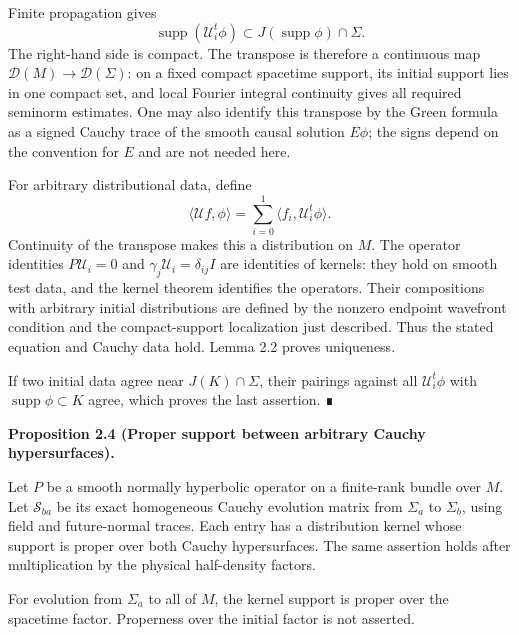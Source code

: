 \documentclass[
  english,
  11pt,
  reqno]{amsart}
\makeatletter
\newcommand{\pandocstatementheading}[1]{%
  \par\addpenalty{\@beginparpenalty}%
  \addvspace{.5\baselineskip plus .2\baselineskip minus .2\baselineskip}%
  {\normalfont\bfseries #1\par}%
  \nobreak\@afterindenttrue\@afterheading
}
\makeatother
\begin{document}
Finite propagation gives \[
\operatorname{supp}(\mathcal U_i^t\phi)
\subset J(\operatorname{supp}\phi)\cap\Sigma.
\] The right-hand side is compact. The transpose is therefore a
continuous map \(\mathcal D(M)\to\mathcal D(\Sigma)\): on a fixed
compact spacetime support, its initial support lies in one compact set,
and local Fourier integral continuity gives all required seminorm
estimates. One may also identify this transpose by the Green formula as
a signed Cauchy trace of the smooth causal solution \(E\phi\); the signs
depend on the convention for \(E\) and are not needed here.

For arbitrary distributional data, define \[
\langle\mathcal U f,\phi\rangle
=\sum_{i=0}^1\langle f_i,\mathcal U_i^t\phi\rangle.
\] Continuity of the transpose makes this a distribution on \(M\). The
operator identities \(P\mathcal U_i=0\) and
\(\gamma_j\mathcal U_i=\delta_{ij}I\) are identities of kernels: they
hold on smooth test data, and the kernel theorem identifies the
operators. Their compositions with arbitrary initial distributions are
defined by the nonzero endpoint wavefront condition and the
compact-support localization just described. Thus the stated equation
and Cauchy data hold. Lemma 2.2 proves uniqueness.

If two initial data agree near \(J(K)\cap\Sigma\), their pairings
against all \(\mathcal U_i^t\phi\) with
\(\operatorname{supp}\phi\subset K\) agree, which proves the last
assertion. ∎

\pandocstatementheading{\protect{}\label{prop:proper-cauchy-evolution}Proposition 2.4 (Proper support between arbitrary Cauchy hypersurfaces).}

Let \(P\) be a smooth normally hyperbolic operator on a finite-rank
bundle over \(M\). Let \(\mathcal S_{ba}\) be its exact homogeneous
Cauchy evolution matrix from \(\Sigma_a\) to \(\Sigma_b\), using field
and future-normal traces. Each entry has a distribution kernel whose
support is proper over both Cauchy hypersurfaces. The same assertion
holds after multiplication by the physical half-density factors.

For evolution from \(\Sigma_a\) to all of \(M\), the kernel support is
proper over the spacetime factor. Properness over the initial factor is
not asserted.
\end{document}
